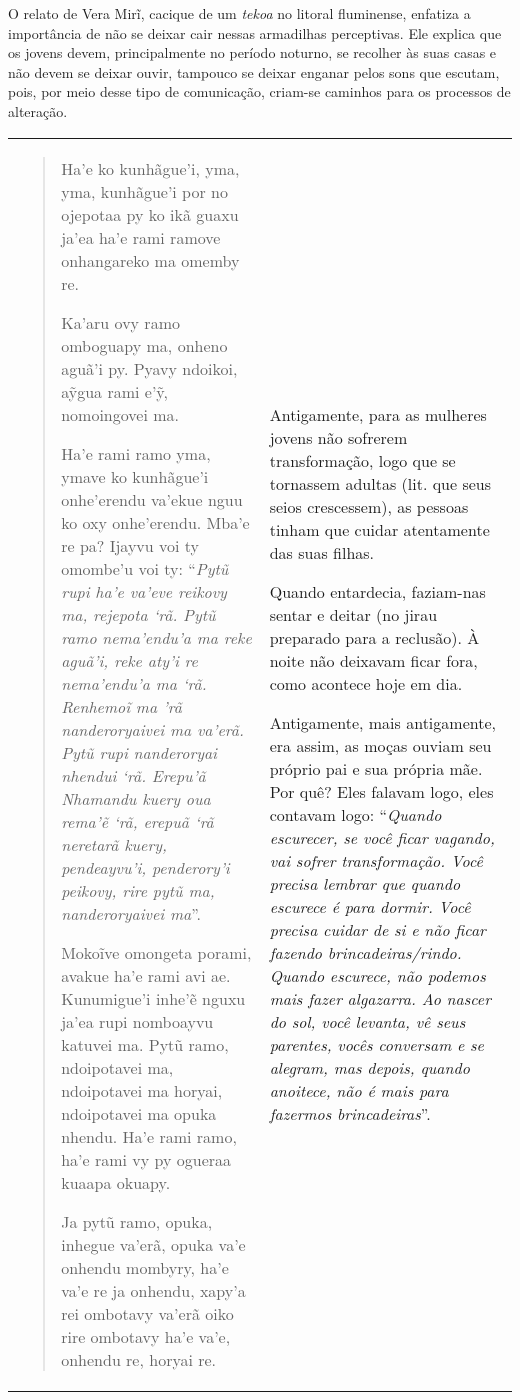 O relato de Vera Mirĩ, cacique de um \emph{tekoa} no litoral fluminense,
enfatiza a importância de não se deixar cair nessas armadilhas
perceptivas. Ele explica que os jovens devem, principalmente no período
noturno, se recolher às suas casas e não devem se deixar ouvir, tampouco
se deixar enganar pelos sons que escutam, pois, por meio desse tipo de
comunicação, criam-se caminhos para os processos de alteração.

\begin{longtable}[]{@{}ll@{}}
\toprule
\begin{minipage}[t]{0.48\columnwidth}\raggedright\strut
\begin{quote}
Ha'e ko kunhãgue'i, yma, yma, kunhãgue'i por no ojepotaa py ko ikã guaxu
ja'ea ha'e rami ramove onhangareko ma omemby re.

Ka'aru ovy ramo omboguapy ma, onheno aguã'i py. Pyavy ndoikoi, aỹgua
rami e'ỹ, nomoingovei ma.

Ha'e rami ramo yma, ymave ko kunhãgue'i onhe'erendu va'ekue nguu ko oxy
onhe'erendu. Mba'e re pa? Ijayvu voi ty omombe'u voi ty: ``\emph{Pytũ
rupi ha'e va'eve reikovy ma, rejepota `rã. Pytũ ramo nema'endu'a ma reke
aguã'i, reke aty'i re nema'endu'a ma `rã. Renhemoĩ ma 'rã nanderoryaivei
ma va'erã. Pytũ rupi nanderoryai nhendui `rã. Erepu'ã Nhamandu kuery oua
rema'ẽ `rã, erepuã `rã neretarã kuery, pendeayvu'i, penderory'i peikovy,
rire pytũ ma, nanderoryaivei ma}''.

Mokoĩve omongeta porami, avakue ha'e rami avi ae. Kunumigue'i inhe'ẽ
nguxu ja'ea rupi nomboayvu katuvei ma. Pytũ ramo, ndoipotavei ma,
ndoipotavei ma horyai, ndoipotavei ma opuka nhendu. Ha'e rami ramo, ha'e
rami vy py ogueraa kuaapa okuapy.

Ja pytũ ramo, opuka, inhegue va'erã, opuka va'e onhendu mombyry, ha'e
va'e re ja onhendu, xapy'a rei ombotavy va'erã oiko rire ombotavy ha'e
va'e, onhendu re, horyai re.
\end{quote}\strut
\end{minipage} & \begin{minipage}[t]{0.48\columnwidth}\raggedright\strut
Antigamente, para as mulheres jovens não sofrerem transformação, logo
que se tornassem adultas (lit. que seus seios crescessem), as pessoas
tinham que cuidar atentamente das suas filhas.

Quando entardecia, faziam-nas sentar e deitar (no jirau preparado para a
reclusão). À noite não deixavam ficar fora, como acontece hoje em dia.

Antigamente, mais antigamente, era assim, as moças ouviam seu próprio
pai e sua própria mãe. Por quê? Eles falavam logo, eles contavam logo:
``\emph{Quando escurecer, se você ficar vagando, vai sofrer
transformação. Você precisa lembrar que quando escurece é para dormir.
Você precisa cuidar de si e não ficar fazendo brincadeiras/rindo. Quando
escurece, não podemos mais fazer algazarra. Ao nascer do sol, você
levanta, vê seus parentes, vocês conversam e se alegram, mas depois,
quando anoitece, não é mais para fazermos brincadeiras}''.


\end{minipage}
\end{longtable}
